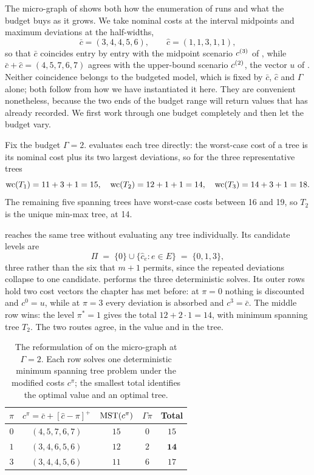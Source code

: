 The micro-graph of  shows both how the enumeration of  runs and what the budget buys as it grows.
We take nominal costs at the interval midpoints and maximum deviations at the half-widths,
\[
\bar{c} = (3, 4, 4, 5, 6), \qquad \hat{c} = (1, 1, 3, 1, 1),
\]
so that $\bar{c}$ coincides entry by entry with the midpoint scenario $c^{(3)}$ of , while $\bar{c} + \hat{c} = (4, 5, 7, 6, 7)$ agrees with the upper-bound scenario $c^{(2)}$, the vector $u$ of .
Neither coincidence belongs to the budgeted model, which is fixed by $\bar{c}$, $\hat{c}$ and $\Gamma$ alone; both follow from how we have instantiated it here.
They are convenient nonetheless, because the two ends of the budget range will return values that  has already recorded.
We first work through one budget completely and then let the budget vary.

Fix the budget $\Gamma = 2$.
 evaluates each tree directly: the worst-case cost of a tree is its nominal cost plus its two largest deviations, so for the three representative trees
\[
\mathrm{wc}(T_1) = 11 + 3 + 1 = 15, \quad
\mathrm{wc}(T_2) = 12 + 1 + 1 = 14, \quad
\mathrm{wc}(T_3) = 14 + 3 + 1 = 18.
\]
The remaining five spanning trees have worst-case costs between 16 and 19, so $T_2$ is the unique min-max tree, at 14.

 reaches the same tree without evaluating any tree individually.
Its candidate levels are
\[
\Pi \;=\; \{0\} \cup \{\hat{c}_e : e \in E\} \;=\; \{0, 1, 3\},
\]
three rather than the six that $m + 1$ permits, since the repeated deviations collapse to one candidate.
 performs the three deterministic solves.
Its outer rows hold two cost vectors the chapter has met before: at $\pi = 0$ nothing is discounted and $c^{0} = u$, while at $\pi = 3$ every deviation is absorbed and $c^{3} = \bar{c}$.
The middle row wins: the level $\pi^{*} = 1$ gives the total $12 + 2 \cdot 1 = 14$, with minimum spanning tree $T_2$.
The two routes agree, in the value and in the tree.

\begin{table}[htbp]
\centering
\caption{The reformulation of  on the micro-graph at $\Gamma = 2$. Each row solves one deterministic minimum spanning tree problem under the modified costs $c^{\pi}$; the smallest total identifies the optimal value and an optimal tree.}
\label{tab:micro-graph-budgeted}
\begin{tabular}{c c c c c}
\toprule
$\pi$ & $c^{\pi} = \bar{c} + [\hat{c} - \pi]^{+}$ & $\mathrm{MST}(c^{\pi})$ & $\Gamma\pi$ & Total \\
\midrule
$0$ & $(4, 5, 7, 6, 7)$ & $15$ & $0$ & $15$ \\
$1$ & $(3, 4, 6, 5, 6)$ & $12$ & $2$ & $\mathbf{14}$ \\
$3$ & $(3, 4, 4, 5, 6)$ & $11$ & $6$ & $17$ \\
\bottomrule
\end{tabular}
\end{table}

